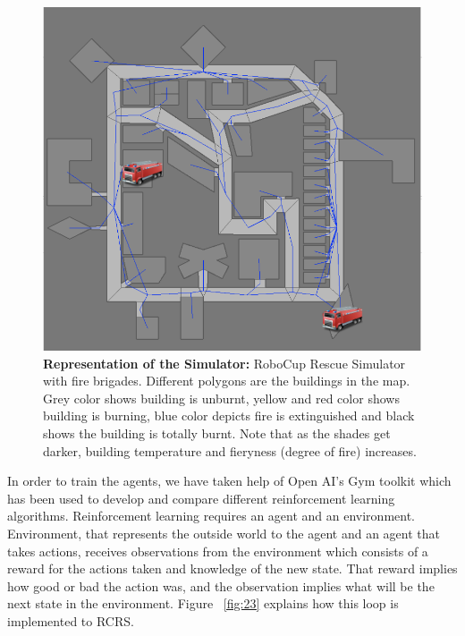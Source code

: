 \documentclass[12pt]{report}
\begin{document}
\begin{figure}[!h]
    \centering
    \includegraphics[width=12cm]{12}
    \caption{\textbf{Representation of the Simulator:} RoboCup Rescue Simulator with fire brigades. Different polygons are the buildings in the map. Grey color shows building is unburnt, yellow and red color shows building is burning, blue color depicts fire is extinguished and black shows the building is totally burnt. Note that as the shades get darker, building temperature and fieryness (degree of fire) increases.}
    \label{fig:RepresentationofSimulator}
\end{figure}

In order to train the agents, we have taken help of Open AI's Gym toolkit \cite{brockman2016openai} which has been used to develop and compare different reinforcement learning algorithms. Reinforcement learning requires an agent and an environment. Environment, that represents the outside world to the agent and an agent that takes actions, receives observations from the environment which consists of a reward for the actions taken and knowledge of the new state. That reward implies how good or bad the action was, and the observation implies what will be the next state in the environment. Figure ~\ref{fig:23} explains how this loop is implemented to RCRS. 
\end{document}
